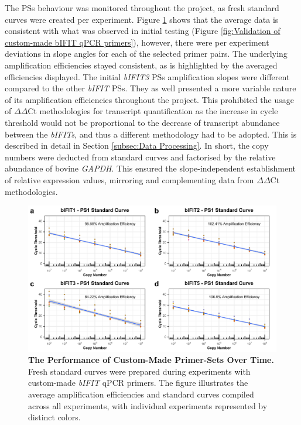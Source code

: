 The PSs behaviour was monitored throughout the project, as fresh standard curves were created per experiment. Figure \ref{fig:The Performance of Custom Made Primer Sets Over Time} shows that the average data is consistent with what was observed in initial testing (Figure \ref{fig:Validation of custom-made bIFIT qPCR primers}), however, there were per experiment deviations in slope angles for each of the selected primer pairs. The underlying amplification efficiencies stayed consistent, as is highlighted by the averaged efficiencies displayed. The initial \textit{bIFIT3} PSs amplification slopes were different compared to the other \textit{bIFIT} PSs. They as well presented a more variable nature of its amplification efficiencies throughout the project. This prohibited the usage of \(\Delta\)\(\Delta\)Ct methodologies for transcript quantification as the increase in cycle threshold would not be proportional to the decrease of transcript abundance between the \textit{bIFITs}, and thus a different methodology had to be adopted. This is described in detail in Section \ref{subsec:Data Processing}. In short, the copy numbers were deducted from standard curves and factorised by the relative abundance of bovine \textit{GAPDH}. This ensured the slope-independent establishment of relative expression values, mirroring and complementing data from \(\Delta\)\(\Delta\)Ct methodologies.

\begin{figure}
    \centering
    \includegraphics[width=1\linewidth]{07. Chapter 2/Figs/01. Technologies/03. standard curves behaviour.pdf}
    \caption[The Performance of Custom-Made Primer-Sets Over Time.]{\textbf{The Performance of Custom-Made Primer-Sets Over Time.} Fresh standard curves were prepared during experiments with custom-made \textit{bIFIT} qPCR primers. The figure illustrates the average amplification efficiencies and standard curves compiled across all experiments, with individual experiments represented by distinct colors.}
    \label{fig:The Performance of Custom Made Primer Sets Over Time}
\end{figure}


